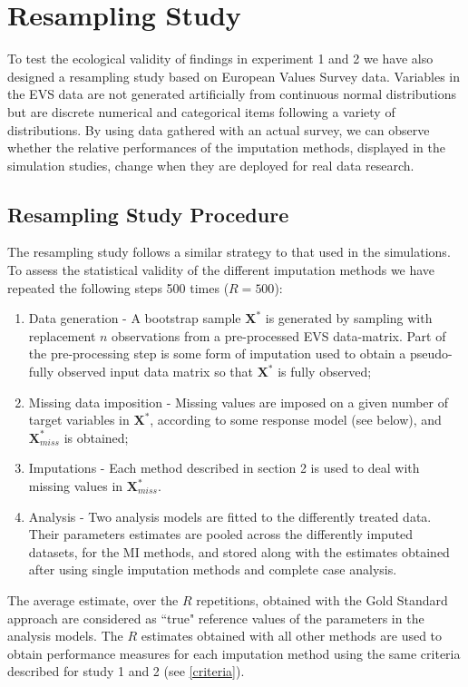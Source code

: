 \section{Resampling Study}

To test the ecological validity of findings in experiment 1 and 2 we have also designed a
resampling study based on European Values Survey data.
Variables in the EVS data are not generated artificially from continuous normal distributions 
but are discrete numerical and categorical items following a variety of distributions.
By using data gathered with an actual survey, we can observe whether the relative 
performances of the imputation methods, displayed in the simulation studies, change when they are 
deployed for real data research.

\subsection{Resampling Study Procedure} \label{resProc}

The resampling study follows a similar strategy to that used in the simulations. 
To assess the statistical validity of the different imputation methods we have repeated the 
following steps 500 times ($R = 500$):

\begin{enumerate}
	\item Data generation - A bootstrap sample $\bm{X}^{*}$ is generated by sampling with replacement $n$ 
		observations from a pre-processed EVS data-matrix. 
		Part of the pre-processing step is some form of imputation used to obtain a pseudo-fully observed 
		input data matrix so that $\bm{X}^{*}$ is fully observed;
	\item Missing data imposition - Missing values are imposed on a given number of target variables
		in $\bm{X}^{*}$, according to some response model (see below), and $\bm{X}^{*}_{miss}$ is 
		obtained;
	\item Imputations - Each method described in section 2 is used to deal with missing values
		in $\bm{X}^{*}_{miss}$.
	\item Analysis - Two analysis models are fitted to the differently treated data.
		Their parameters estimates are pooled across the differently imputed datasets, for the MI methods, and
		stored along with the estimates obtained after using single imputation methods and complete case 
		analysis.
\end{enumerate}

	The average estimate, over the $R$ repetitions, obtained with the Gold Standard approach are considered 
	as ``true" reference values of the parameters in the analysis models.
	The $R$ estimates obtained with all other methods are used to obtain performance measures for each imputation 
	method using the same criteria described for study 1 and 2 (see \ref{criteria}).

